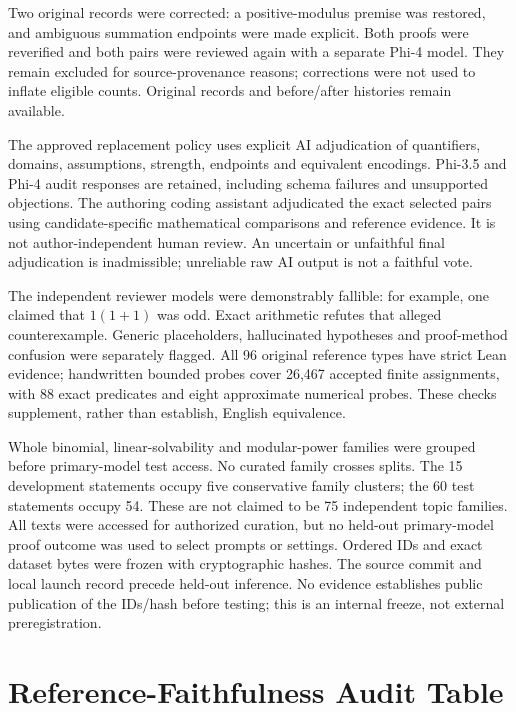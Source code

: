 \documentclass[runningheads,a4paper]{llncs}
\begin{document}
Two original records were corrected: a positive-modulus premise was restored,
and ambiguous summation endpoints were made explicit. Both proofs were
reverified and both pairs were reviewed again with a separate Phi-4 model.
They remain excluded for source-provenance reasons; corrections were not used
to inflate eligible counts. Original records and before/after histories remain
available.



The approved replacement policy uses explicit AI adjudication of quantifiers,
domains, assumptions, strength, endpoints and equivalent encodings. Phi-3.5 and
Phi-4 audit responses are retained, including schema failures and unsupported
objections. The authoring coding assistant adjudicated the exact selected pairs
using candidate-specific mathematical comparisons and reference evidence. It
is not author-independent human review. An uncertain or unfaithful final
adjudication is inadmissible; unreliable raw AI output is not a faithful vote.

The independent reviewer models were demonstrably fallible: for example, one
claimed that $1(1+1)$ was odd. Exact arithmetic refutes that alleged
counterexample. Generic placeholders, hallucinated hypotheses and proof-method
confusion were separately flagged. All 96 original reference types have strict
Lean evidence; handwritten bounded probes cover 26,467 accepted finite
assignments, with 88 exact predicates and eight approximate numerical probes.
These checks supplement, rather than establish, English equivalence.

Whole binomial, linear-solvability and modular-power families were grouped before
primary-model test access. No curated family crosses splits. The 15 development
statements occupy five conservative family clusters; the 60 test statements
occupy 54. These are not claimed to be 75 independent topic families.
All texts were accessed for authorized curation, but no held-out primary-model
proof outcome was used to select prompts or settings. Ordered IDs and exact
dataset bytes were frozen with cryptographic hashes. The source commit and local
launch record precede held-out inference. No evidence establishes public publication
of the IDs/hash before testing; this is an internal freeze, not external preregistration.


\section{Reference-Faithfulness Audit Table}
\label{app:semantic-audit}

\end{document}
